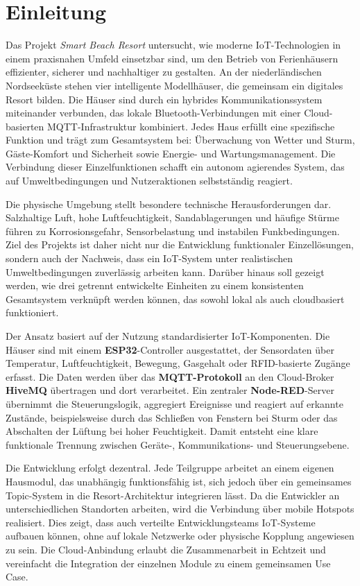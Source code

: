 \section{Einleitung}
Das Projekt \textit{Smart Beach Resort} untersucht, wie moderne IoT-Technologien in einem praxisnahen Umfeld einsetzbar sind, um den Betrieb von Ferienhäusern effizienter, sicherer und nachhaltiger zu gestalten. 
An der niederländischen Nordseeküste stehen vier intelligente Modellhäuser, die gemeinsam ein digitales Resort bilden. 
Die Häuser sind durch ein hybrides Kommunikationssystem miteinander verbunden, das lokale Bluetooth-Verbindungen mit einer Cloud-basierten MQTT-Infrastruktur kombiniert. 
Jedes Haus erfüllt eine spezifische Funktion und trägt zum Gesamtsystem bei: Überwachung von Wetter und Sturm, Gäste-Komfort und Sicherheit sowie Energie- und Wartungsmanagement. 
Die Verbindung dieser Einzelfunktionen schafft ein autonom agierendes System, das auf Umweltbedingungen und Nutzeraktionen selbstständig reagiert.

Die physische Umgebung stellt besondere technische Herausforderungen dar. 
Salzhaltige Luft, hohe Luftfeuchtigkeit, Sandablagerungen und häufige Stürme führen zu Korrosionsgefahr, Sensorbelastung und instabilen Funkbedingungen. 
Ziel des Projekts ist daher nicht nur die Entwicklung funktionaler Einzellösungen, sondern auch der Nachweis, dass ein IoT-System unter realistischen Umweltbedingungen zuverlässig arbeiten kann. 
Darüber hinaus soll gezeigt werden, wie drei getrennt entwickelte Einheiten zu einem konsistenten Gesamtsystem verknüpft werden können, das sowohl lokal als auch cloudbasiert funktioniert.

Der Ansatz basiert auf der Nutzung standardisierter IoT-Komponenten. 
Die Häuser sind mit einem \textbf{ESP32}-Controller ausgestattet, der Sensordaten über Temperatur, Luftfeuchtigkeit, Bewegung, Gasgehalt oder RFID-basierte Zugänge erfasst. 
Die Daten werden über das \textbf{MQTT-Protokoll} an den Cloud-Broker \textbf{HiveMQ} übertragen und dort verarbeitet. 
Ein zentraler \textbf{Node-RED}-Server übernimmt die Steuerungslogik, aggregiert Ereignisse und reagiert auf erkannte Zustände, beispielsweise durch das Schließen von Fenstern bei Sturm oder das Abschalten der Lüftung bei hoher Feuchtigkeit. 
Damit entsteht eine klare funktionale Trennung zwischen Geräte-, Kommunikations- und Steuerungsebene.

Die Entwicklung erfolgt dezentral. 
Jede Teilgruppe arbeitet an einem eigenen Hausmodul, das unabhängig funktionsfähig ist, sich jedoch über ein gemeinsames Topic-System in die Resort-Architektur integrieren lässt. 
Da die Entwickler an unterschiedlichen Standorten arbeiten, wird die Verbindung über mobile Hotspots realisiert. 
Dies zeigt, dass auch verteilte Entwicklungsteams IoT-Systeme aufbauen können, ohne auf lokale Netzwerke oder physische Kopplung angewiesen zu sein. 
Die Cloud-Anbindung erlaubt die Zusammenarbeit in Echtzeit und vereinfacht die Integration der einzelnen Module zu einem gemeinsamen Use Case.

